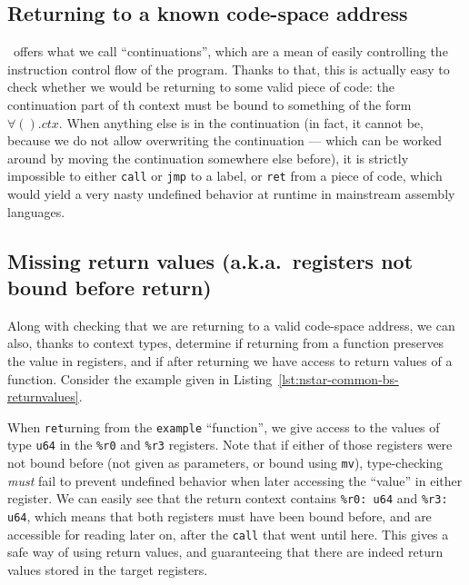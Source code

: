 \subsection{Returning to a known code-space address}\label{subsec:nstar-common-bs-restrictions-ret}

\nstar\ offers what we call ``continuations'', which are a mean of easily controlling the instruction control flow of the program.
Thanks to that, this is actually easy to check whether we would be returning to some valid piece of code: the continuation part of th context must be bound to something of the form $\forall().ctx$.
When anything else is in the continuation (in fact, it cannot be, because we do not allow overwriting the continuation --- which can be worked around by moving the continuation somewhere else before), it is strictly impossible to either \texttt{call} or \texttt{jmp} to a label, or \texttt{ret} from a piece of code, which would yield a very nasty undefined behavior at runtime in mainstream assembly languages.

\subsection{Missing return values (a.k.a.\ registers not bound before return)}\label{subsec:nstar-common-bs-restrictions-unboundregs}

Along with checking that we are returning to a valid code-space address, we can also, thanks to context types, determine if returning from a function preserves the value in registers, and if after returning we have access to return values of a function.
Consider the example given in Listing~\ref{lst:nstar-common-bs-returnvalues}.

When \texttt{ret}urning from the \texttt{example} ``function'', we give access to the values of type \texttt{u64} in the \texttt{\%r0} and \texttt{\%r3} registers.
Note that if either of those registers were not bound before (not given as parameters, or bound using \texttt{mv}), type-checking \textit{must} fail to prevent undefined behavior when later accessing the ``value'' in either register.
We can easily see that the return context contains \texttt{\%r0: u64} and \texttt{\%r3: u64}, which means that both registers must have been bound before, and are accessible for reading later on, after the \texttt{call} that went until here.
This gives a safe way of using return values, and guaranteeing that there are indeed return values stored in the target registers.

